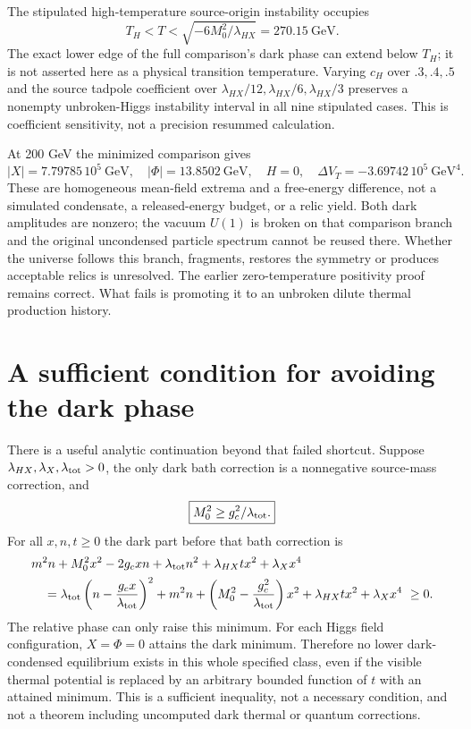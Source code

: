 \documentclass[11pt]{article}
\newcommand{\lp}{\lambda_{HX}}
\newcommand{\lt}{\lambda_{\rm tot}}
\begin{document}
The stipulated high-temperature source-origin instability occupies
\begin{equation}
 T_H<T<\sqrt{-6M_0^2/\lp}=270.15\ \mathrm{GeV}.
\end{equation}
The exact lower edge of the full comparison's dark phase can extend below
$T_H$; it is not asserted here as a physical transition temperature.
Varying $c_H$ over $.3,.4,.5$ and the source tadpole coefficient over
$\lp/12,\lp/6,\lp/3$ preserves a nonempty unbroken-Higgs instability
interval in all nine stipulated cases. This is coefficient sensitivity,
not a precision resummed calculation.

At 200 GeV the minimized comparison gives
\begin{equation}
 |X|=7.79785\,10^5\ \mathrm{GeV},\quad
 |\Phi|=13.8502\ \mathrm{GeV},\quad H=0,\quad
 \Delta V_T=-3.69742\,10^5\ \mathrm{GeV}^4.
\end{equation}
These are homogeneous mean-field extrema and a free-energy difference,
not a simulated condensate, a released-energy budget, or a relic yield.
Both dark amplitudes are nonzero; the vacuum $U(1)$ is broken on that
comparison branch and the original uncondensed particle spectrum cannot
be reused there. Whether the universe follows this branch, fragments,
restores the symmetry or produces acceptable relics is unresolved.
The earlier zero-temperature positivity proof remains correct. What fails
is promoting it to an unbroken dilute thermal production history.

\section{A sufficient condition for avoiding the dark phase}
There is a useful analytic continuation beyond that failed shortcut.
Suppose $\lp,\lambda_X,\lt>0$, the only dark bath correction is a
nonnegative source-mass correction, and
\begin{equation}
 \boxed{M_0^2\ge g_c^2/\lt.}
\label{eq:sufficient}
\end{equation}
For all $x,n,t\ge0$ the dark part before that bath correction is
\begin{align}
 &m^2n+M_0^2x^2-2g_cxn+\lt n^2+\lp tx^2+\lambda_Xx^4\\
 &\quad=\lt\left(n-\frac{g_cx}{\lt}\right)^2
 +m^2n+\left(M_0^2-\frac{g_c^2}{\lt}\right)x^2
 +\lp tx^2+\lambda_Xx^4\ \ge0.\nonumber
\end{align}
The relative phase can only raise this minimum. For each Higgs field
configuration, $X=\Phi=0$ attains the dark minimum. Therefore no lower
dark-condensed equilibrium exists in this whole specified class, even if
the visible thermal potential is replaced by an arbitrary bounded function
of $t$ with an attained minimum. This is a sufficient inequality, not a
necessary condition, and not a theorem including uncomputed dark thermal
or quantum corrections.
\end{document}

